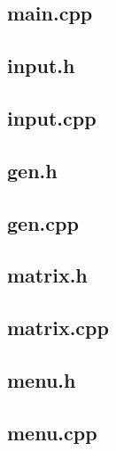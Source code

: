 \subsection*{main.cpp}

\newpage

\subsection*{input.h}

\newpage

\subsection*{input.cpp}

\newpage

\subsection*{gen.h}

\newpage

\subsection*{gen.cpp}

\newpage

\subsection*{matrix.h}

\newpage

\subsection*{matrix.cpp}

\newpage

\subsection*{menu.h}

\newpage

\subsection*{menu.cpp}
